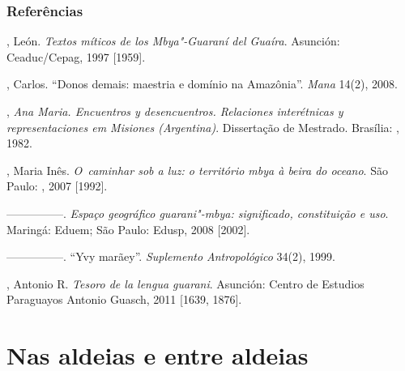 \section{Referências}

\begin{Parskip}
, León. \emph{Textos míticos de los Mbya"-Guaraní del Guaíra}. Asunción:
Ceaduc/Cepag, 1997 [1959].

, Carlos. ``Donos demais: maestria e domínio na Amazônia''. \emph{Mana}
14(2), 2008. 

 , \emph{Ana Maria. Encuentros y desencuentros. Relaciones
interétnicas y representaciones em Misiones (Argentina)}. Dissertação de
Mestrado. Brasília: , 1982.

, Maria Inês. \emph{O~caminhar sob a luz: o território mbya à beira do
oceano}. São Paulo: , 2007 [1992].

—————. \emph{Espaço geográfico guarani"-mbya: significado, constituição e uso}.
Maringá: Eduem; São Paulo: Edusp, 2008 [2002].

—————. ``Yvy marãey''. \emph{Suplemento Antropológico} 34(2), 1999.

, Antonio R. \emph{Tesoro de la lengua guarani}. Asunción: Centro de
Estudios Paraguayos Antonio Guasch, 2011 [1639, 1876].
\end{Parskip}

\makeatletter\@openrightfalse
\movetooddpage
\part{Nas aldeias e entre aldeias}

